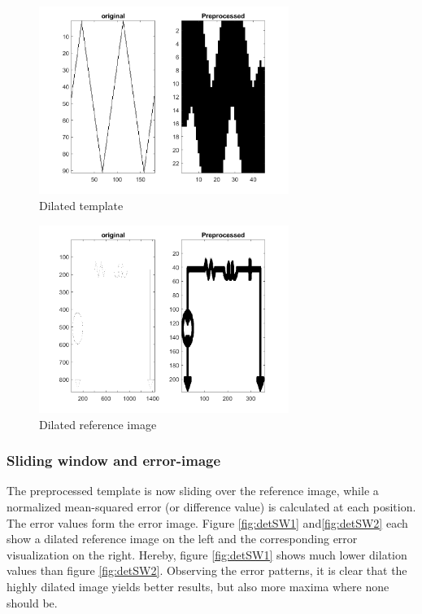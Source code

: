\documentclass[10pt,twocolumn,letterpaper]{article}
\begin{document}
\begin{figure}[!ht]
\includegraphics[width = 3.2in]{img/detPP1.png}
\caption{Dilated template}
\label{fig:detPP1}
\end{figure}
\par

\begin{figure}[!ht]
\includegraphics[width = 3.2in]{img/detPP2.png}
\caption{Dilated reference image}
\label{fig:detPP2}
\end{figure}

\subsubsection*{Sliding window and error-image}

The preprocessed template is now sliding over the reference image, while a normalized mean-squared error (or difference value) is calculated at each position. The error values form the error image. Figure \ref{fig:detSW1} and\ref{fig:detSW2} each show a dilated reference image on the left and the corresponding error visualization on the right. Hereby, figure \ref{fig:detSW1} shows much lower dilation values than figure \ref{fig:detSW2}. Observing the error patterns, it is clear that the highly dilated image yields better results, but also more maxima where none should be.
\par
\end{document}
